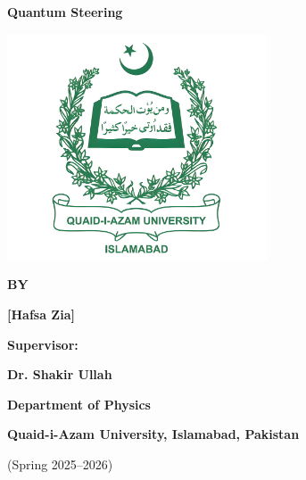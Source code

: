 \documentclass[12pt,a4paper]{report}
\begin{document}
\begin{titlepage}
	\centering

	{\LARGE \textbf{ Quantum Steering } \par}

	\vspace{1.5cm}

	\includegraphics[width=7.7cm]{QAU_enhanced_Logo} %

	\vspace{1.2cm}

	{\large \textbf{BY} \par}
	{\Large \textbf{[Hafsa Zia]} \par}
	\vspace{0.6cm}

	{\large \textbf{Supervisor:} \\}
	{\Large \textbf{Dr. Shakir Ullah} \par}

	\vspace{4cm}

	{\Large\textbf{Department of Physics} \par}
	{\textbf{Quaid-i-Azam University, Islamabad, Pakistan} \par}
	{(Spring 2025--2026) \par}

\end{titlepage}
\end{document}
